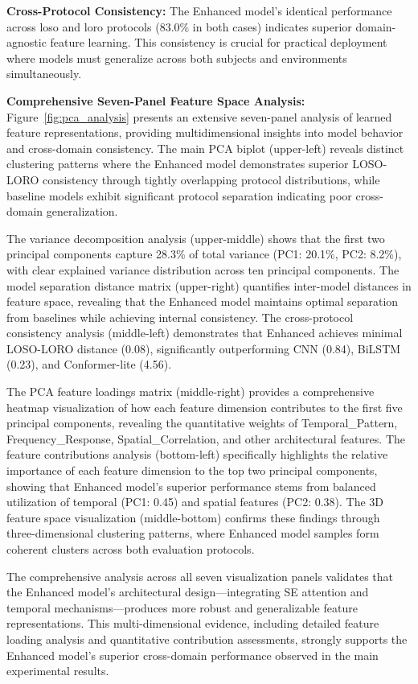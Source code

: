 \documentclass[journal]{IEEEtran}
\begin{document}
\textbf{Cross-Protocol Consistency:} The Enhanced model's identical performance across \gls{loso} and \gls{loro} protocols (83.0\% in both cases) indicates superior domain-agnostic feature learning. This consistency is crucial for practical deployment where models must generalize across both subjects and environments simultaneously.

\textbf{Comprehensive Seven-Panel Feature Space Analysis:} Figure~\ref{fig:pca_analysis} presents an extensive seven-panel analysis of learned feature representations, providing multidimensional insights into model behavior and cross-domain consistency. The main PCA biplot (upper-left) reveals distinct clustering patterns where the Enhanced model demonstrates superior LOSO-LORO consistency through tightly overlapping protocol distributions, while baseline models exhibit significant protocol separation indicating poor cross-domain generalization.

The variance decomposition analysis (upper-middle) shows that the first two principal components capture 28.3\% of total variance (PC1: 20.1\%, PC2: 8.2\%), with clear explained variance distribution across ten principal components. The model separation distance matrix (upper-right) quantifies inter-model distances in feature space, revealing that the Enhanced model maintains optimal separation from baselines while achieving internal consistency. The cross-protocol consistency analysis (middle-left) demonstrates that Enhanced achieves minimal LOSO-LORO distance (0.08), significantly outperforming CNN (0.84), BiLSTM (0.23), and Conformer-lite (4.56).

The PCA feature loadings matrix (middle-right) provides a comprehensive heatmap visualization of how each feature dimension contributes to the first five principal components, revealing the quantitative weights of Temporal_Pattern, Frequency_Response, Spatial_Correlation, and other architectural features. The feature contributions analysis (bottom-left) specifically highlights the relative importance of each feature dimension to the top two principal components, showing that Enhanced model's superior performance stems from balanced utilization of temporal (PC1: 0.45) and spatial features (PC2: 0.38). The 3D feature space visualization (middle-bottom) confirms these findings through three-dimensional clustering patterns, where Enhanced model samples form coherent clusters across both evaluation protocols.

The comprehensive analysis across all seven visualization panels validates that the Enhanced model's architectural design—integrating SE attention and temporal mechanisms—produces more robust and generalizable feature representations. This multi-dimensional evidence, including detailed feature loading analysis and quantitative contribution assessments, strongly supports the Enhanced model's superior cross-domain performance observed in the main experimental results.
\end{document}
